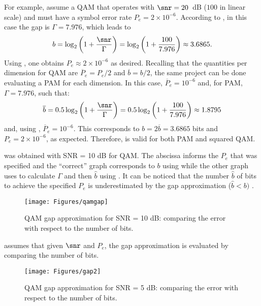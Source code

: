 
For example, assume a QAM that operates with $\snr = 20$~dB ($100$ in linear scale) and must have a symbol error rate $P_e = 2 \times 10^{-6}$. According to , in this case the gap is $\Gamma = 7.976$, which leads to
\[
b = \log_2 \left( 1 + \frac{\snr}{\Gamma}  \right) = \log_2 \left( 1 + \frac{100}{7.976}  \right)  \approx 3.6865.
\]
Using , one obtains $P_e \approx 2 \times 10^{-6}$ as desired. Recalling that the quantities per dimension for QAM are $\overline P_e = P_e / 2$ and $\overline b = b / 2$, the same project can be done evaluating a PAM for each dimension. In this case, $\overline P_e = 10^{-6}$ and, for PAM, $\Gamma = 7.976$, such that:
\[
\overline b = 0.5 \log_2 \left( 1 + \frac{\snr}{\Gamma}  \right) = 0.5 \log_2 \left( 1 + \frac{100}{7.976} \right) \approx 1.8795
\]
and, using , $\overline P_e = 10^{-6}$.
This corresponds to $b = 2 \overline b = 3.6865$ bits and $P_e = 2 \times 10^{-6}$, as expected.
Therefore,  is valid for both PAM and squared QAM.

was obtained with SNR = 10 dB for QAM. The abscissa informs the $P_e$ that was specified and the ``correct'' graph corresponds to $b$ using   while the other graph uses  to calculate $\Gamma$ and then $\hat b$ using . It can be noticed that the number $\hat b$ of bits to achieve the specified $P_e$ is underestimated by the gap approximation ($\hat b < b)$ . 


\begin{figure}[htbp]
\centering
\texttt{[image: Figures/qamgap]}
\caption{QAM gap approximation for SNR = 10 dB: comparing the error with respect to the number of bits.\label{fig:qamgap}}
\end{figure}

 assumes that given $\snr$ and $P_e$, the gap approximation is evaluated by comparing the number of bits. 

\begin{figure}[htbp]
\centering
\texttt{[image: Figures/gap2]}
\caption{QAM gap approximation for SNR = 5 dB: comparing the error with respect to the number of bits.\label{fig:gap2}}
\end{figure}

